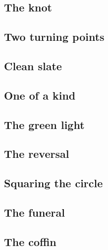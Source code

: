 
\subsection{The knot}


\subsection{Two turning points}


\subsection{Clean slate}



\subsection{One of a kind}


\subsection{The green light}


\subsection{The reversal}


\subsection{Squaring the circle}


\subsection{The funeral}


\subsection{The coffin}



